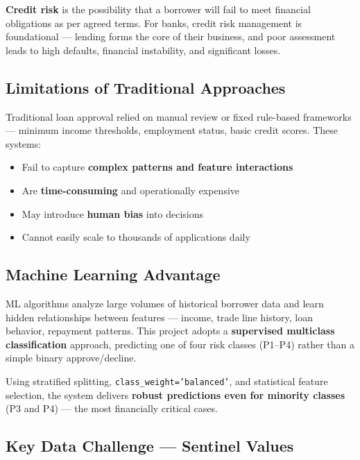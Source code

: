 \documentclass[12pt,a4paper]{article}
\begin{document}
\textbf{Credit risk} is the possibility that a borrower will fail to meet
financial obligations as per agreed terms. For banks, credit risk management
is foundational --- lending forms the core of their business, and poor
assessment leads to high defaults, financial instability, and significant losses.

\subsection{Limitations of Traditional Approaches}

Traditional loan approval relied on manual review or fixed rule-based frameworks
--- minimum income thresholds, employment status, basic credit scores.
These systems:

\begin{itemize}
  \item[\textcolor{danger}{\faTimesCircle}]
    Fail to capture \textbf{complex patterns and feature interactions}
  \item[\textcolor{danger}{\faTimesCircle}]
    Are \textbf{time-consuming} and operationally expensive
  \item[\textcolor{danger}{\faTimesCircle}]
    May introduce \textbf{human bias} into decisions
  \item[\textcolor{danger}{\faTimesCircle}]
    Cannot easily scale to thousands of applications daily
\end{itemize}

\subsection{Machine Learning Advantage}

ML algorithms analyze large volumes of historical borrower data and learn hidden
relationships between features --- income, trade line history, loan behavior,
repayment patterns. This project adopts a \textbf{supervised multiclass
classification} approach, predicting one of four risk classes (P1--P4) rather
than a simple binary approve/decline.

\begin{successbox}
  Using stratified splitting, \texttt{class\_weight='balanced'}, and statistical
  feature selection, the system delivers \textbf{robust predictions even for
  minority classes} (P3 and P4) --- the most financially critical cases.
\end{successbox}

\subsection{Key Data Challenge --- Sentinel Values}
\end{document}
